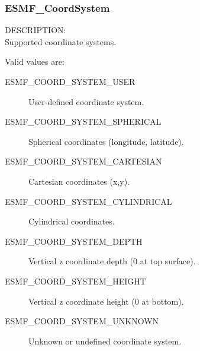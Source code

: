 \subsubsection{ESMF\_CoordSystem}

{\sf DESCRIPTION:\\}
Supported coordinate systems.

Valid values are:
\begin{description}
   \item [ESMF\_COORD\_SYSTEM\_USER]
         User-defined coordinate system.

   \item [ESMF\_COORD\_SYSTEM\_SPHERICAL]
         Spherical coordinates (longitude, latitude).

   \item [ESMF\_COORD\_SYSTEM\_CARTESIAN]
         Cartesian coordinates (x,y).

   \item [ESMF\_COORD\_SYSTEM\_CYLINDRICAL] 
         Cylindrical coordinates.

   \item [ESMF\_COORD\_SYSTEM\_DEPTH]
         Vertical z coordinate depth (0 at top surface).

   \item [ESMF\_COORD\_SYSTEM\_HEIGHT]
         Vertical z coordinate height (0 at bottom).

   \item [ESMF\_COORD\_SYSTEM\_UNKNOWN]
         Unknown or undefined coordinate system.
\end{description}

